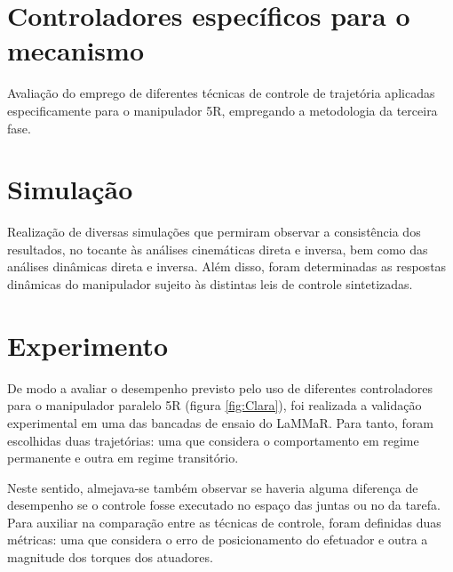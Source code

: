\documentclass[]{politex}
\begin{document}
\section{Controladores específicos para o mecanismo} Avaliação do emprego de diferentes técnicas de controle de trajetória aplicadas especificamente para o manipulador 5R, empregando a metodologia da terceira fase.

\section{Simulação} Realização de diversas simulações que permiram observar a consistência dos resultados, no tocante às análises cinemáticas direta e inversa, bem como das análises dinâmicas direta e inversa. Além disso, foram determinadas as respostas dinâmicas do manipulador sujeito às distintas leis de controle sintetizadas.

\section{Experimento} 
De modo a avaliar o desempenho previsto pelo uso de diferentes controladores para o manipulador paralelo 5R (figura \ref{fig:Clara}), foi realizada a validação experimental em uma das bancadas de ensaio do LaMMaR. Para tanto, foram escolhidas duas trajetórias: uma que considera o comportamento em regime permanente e outra em regime transitório. 

Neste sentido, almejava-se também observar se haveria alguma diferença de desempenho se o controle fosse executado no espaço das juntas ou no da tarefa. Para auxiliar na comparação entre as técnicas de controle, foram definidas duas métricas: uma que considera o erro de posicionamento do efetuador e outra a magnitude dos torques dos atuadores.


\end{document}
